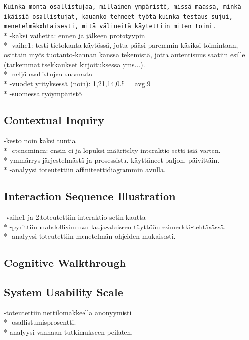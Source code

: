 \documentclass[12pt,a4paper,oneside,pdftex]{report}
\begin{document}
	\texttt{Kuinka monta osallistujaa, millainen ympäristö, missä maassa, minkä ikäisiä osallistujat, kauanko tehneet työtä}
    	\texttt{kuinka testaus sujui, menetelmäkohtaisesti, mitä välineitä käytettiin miten toimi.}
    	\\*
    	-kaksi vaihetta: ennen ja jälkeen prototyypin
    	\\*
    	-vaihe1: testi-tietokanta käytössä, jotta pääsi paremmin käsiksi toimintaan, osittain myös tuotanto-kannan kanssa tekemistä, jotta autentisuus saatiin esille (tarkemmat tsekkaukset kirjoituksessa yms...).
    	\\*
    	 -neljä osallistujaa suomesta
    	 \\*
    	 -vuodet yrityksessä (noin): 1,21,14,0.5 = avg.9
    	 \\*
    	 -suomessa työympäristö
	  \subsection{Contextual Inquiry}
	 -kesto noin kaksi tuntia
	  \\*
	  -eteneminen: ensin ci ja lopuksi määritelty interaktio-setti isiä varten.
	  \\*
	   ymmärrys järjestelmästä ja prosessista. käyttäneet paljon, päivittäin.
	  \\*
	  -analyysi toteutettiin affiniteettidiagrammin avulla.
	  
	  \subsection{Interaction Sequence Illustration}

	  -vaihe1 ja 2:toteutettiin interaktio-setin kautta
	  \\*
	  -pyrittiin mahdollisimman laaja-alaiseen täyttöön esimerkki-tehtävässä.
	  \\*
	  -analyysi toteutettiin menetelmän ohjeiden mukaisesti.
	
	  \subsection{Cognitive Walkthrough}
	  \subsection{System Usability Scale}
	  -toteutettiin nettilomakkeella anonyymisti
	  \\*
	  -osallistumisprosentti.
	  \\*
	  analyysi vanhaan tutkimukseen peilaten.
\end{document}
